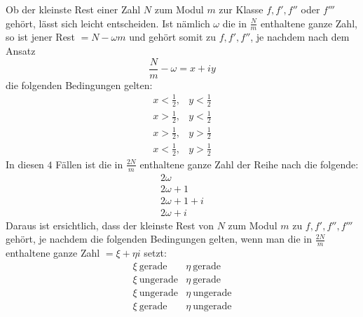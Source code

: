 Ob der kleinste Rest einer Zahl $N$ zum Modul $m$ zur Klasse $f,f',f''$ oder $f'''$ gehört, lässt sich leicht entscheiden. Ist nämlich $\omega$ die in $\frac{N}{m}$ enthaltene ganze Zahl, so ist jener Rest $=N-\omega m$ und gehört somit zu $f,f',f''$, je nachdem nach dem Ansatz
\[
\frac{N}{m}-\omega=x+iy
\]
die folgenden Bedingungen gelten:
\[
\begin{array}{ll}
x<\tfrac12,&y<\tfrac12\\
x>\tfrac12,&y<\tfrac12\\
x>\tfrac12,&y>\tfrac12\\
x<\tfrac12,&y>\tfrac12
\end{array}
\]
In diesen $4$ Fällen ist die in $\frac{2N}{m}$ enthaltene ganze Zahl der Reihe nach die folgende:
\[
\begin{array}{l}
2\omega\\
2\omega+1\\
2\omega+1+i\\
2\omega+i
\end{array}
\]
Daraus ist ersichtlich, dass der kleinste Rest von $N$ zum Modul $m$ zu $f,f',f'',f'''$ gehört, je nachdem die folgenden Bedingungen gelten, wenn man die in $\frac{2N}{m}$ enthaltene ganze Zahl $=\xi+\eta i$ setzt:
\[
\begin{array}{ll}
\xi\ \text{gerade}&\eta\ \text{gerade}\\
\xi\ \text{ungerade}&\eta\ \text{gerade}\\
\xi\ \text{ungerade}&\eta\ \text{ungerade}\\
\xi\ \text{gerade}&\eta\ \text{ungerade}
\end{array}
\]


